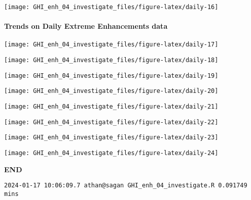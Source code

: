 \documentclass[
  10pt,
  a4paper,oneside]{article}
\begin{document}
\begin{center}\texttt{[image: GHI\_enh\_04\_investigate\_files/figure-latex/daily-16]} \end{center}

\newpage

\hypertarget{trends-on-daily-extreme-enhancements-data}{%
\paragraph{Trends on Daily Extreme Enhancements data}\label{trends-on-daily-extreme-enhancements-data}}

\begin{center}\texttt{[image: GHI\_enh\_04\_investigate\_files/figure-latex/daily-17]} \end{center}

\begin{center}\texttt{[image: GHI\_enh\_04\_investigate\_files/figure-latex/daily-18]} \end{center}

\begin{center}\texttt{[image: GHI\_enh\_04\_investigate\_files/figure-latex/daily-19]} \end{center}

\begin{center}\texttt{[image: GHI\_enh\_04\_investigate\_files/figure-latex/daily-20]} \end{center}

\begin{center}\texttt{[image: GHI\_enh\_04\_investigate\_files/figure-latex/daily-21]} \end{center}

\begin{center}\texttt{[image: GHI\_enh\_04\_investigate\_files/figure-latex/daily-22]} \end{center}

\begin{center}\texttt{[image: GHI\_enh\_04\_investigate\_files/figure-latex/daily-23]} \end{center}

\begin{center}\texttt{[image: GHI\_enh\_04\_investigate\_files/figure-latex/daily-24]} \end{center}

\textbf{END}

\begin{verbatim}
2024-01-17 10:06:09.7 athan@sagan GHI_enh_04_investigate.R 0.091749 mins
\end{verbatim}
\end{document}
